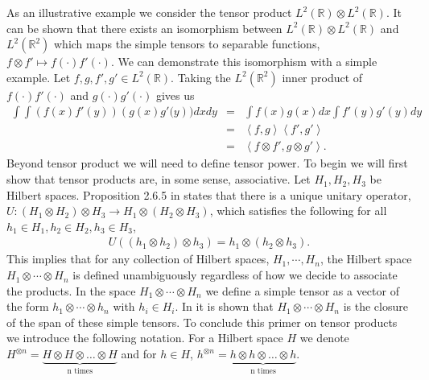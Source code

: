 \documentclass{article} %
\def\rn{\mathbb{R}}
\def\l{\left}
\def\r{\right}
\theoremstyle{definition}
\begin{document}
As an illustrative example we consider the tensor product $L^2\left( \rn \right) \otimes L^2\left( \rn \right)$. It can be shown that there exists an isomorphism between $L^2\left( \rn \right) \otimes L^2\left( \rn \right)$ and $L^2(\rn^2)$ which maps the simple tensors to separable functions, $f \otimes f' \mapsto f(\cdot)f'(\cdot)$. We can demonstrate this isomorphism with a simple example. Let $f,g,f',g'\in L^2\left( \rn \right)$. Taking the $L^2(\rn^2)$ inner product of $f(\cdot)f'(\cdot)$ and $g(\cdot)g'(\cdot)$ gives us 
\begin{eqnarray*}
\int\int \l(f(x)f'(y)\r)\l(g(x)g'(y\r)) dx dy 
&=& \int f(x)g(x) dx \int f'(y)g'(y) dy\\
&=& \l<f,g\r>  \l<f',g'\r>\\
&=& \l<f\otimes f', g \otimes g'\r>.
\end{eqnarray*}
Beyond tensor product we will need to define tensor power. To begin we will first show that tensor products are, in some sense, associative. Let $H_1, H_2, H_3$ be Hilbert spaces. Proposition 2.6.5 in \cite{kadison83} states that there is a unique unitary operator, $U: (H_1 \otimes H_2)\otimes H_3 \to H_1 \otimes (H_2 \otimes H_3)$, which satisfies the following for all $h_1 \in H_1, h_2 \in H_2, h_3 \in H_3$,
\begin{eqnarray*}
	U\left( \left( h_1 \otimes h_2 \right)\otimes h_3 \right) = h_1 \otimes \left( h_2 \otimes h_3 \right).
\end{eqnarray*}
This implies that for any collection of Hilbert spaces, $H_1,\cdots , H_n$, the Hilbert space $H_1 \otimes \cdots \otimes H_n$ is defined unambiguously regardless of how we decide to associate the products. In the space $H_1 \otimes \cdots \otimes H_n$ we define a simple tensor as a vector of the form $h_1 \otimes\cdots\otimes h_n$ with $h_i \in H_i$. In \cite{kadison83} it is shown that $H_1 \otimes\cdots \otimes H_n$ is the closure of the span of these simple tensors. To conclude this primer on tensor products we introduce the following notation. For a Hilbert space $H$ we denote $H^{\otimes n}= \underbrace{H\otimes H \otimes \dots \otimes H}_\text{n times}$ and for $h \in H$, $h^{\otimes n}= \underbrace{h\otimes h \otimes \dots \otimes h}_\text{n times}$.
\end{document}
